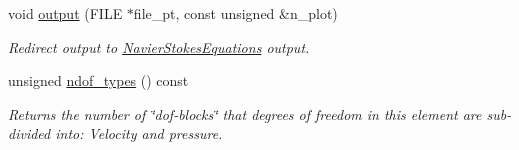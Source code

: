 \begin{DoxyCompactItemize}
void \hyperlink{classoomph_1_1LinearisedAxisymmetricQTaylorHoodElement_ad3c9effcb6919a0d639e50a89c91323d}{output} (F\+I\+LE $\ast$file\+\_\+pt, const unsigned \&n\+\_\+plot)
\begin{DoxyCompactList}\small\item\em Redirect output to \hyperlink{classoomph_1_1NavierStokesEquations}{Navier\+Stokes\+Equations} output. \end{DoxyCompactList}\item 
unsigned \hyperlink{classoomph_1_1LinearisedAxisymmetricQTaylorHoodElement_a0aac46cedbfc8cf27644c5b5fd96d7e4}{ndof\+\_\+types} () const
\begin{DoxyCompactList}\small\item\em Returns the number of \char`\"{}dof-\/blocks\char`\"{} that degrees of freedom in this element are sub-\/divided into\+: Velocity and pressure. \end{DoxyCompactList}\end{DoxyCompactItemize}

